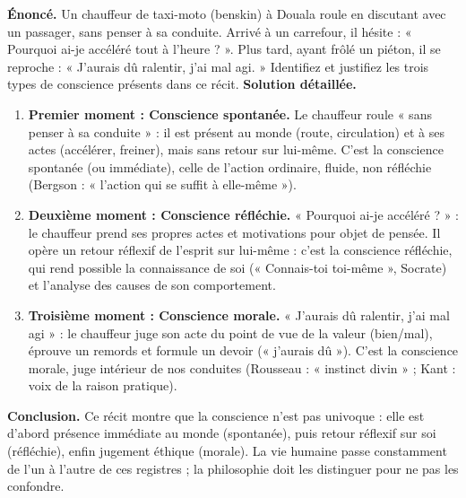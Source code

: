 \documentclass[11pt]{article}
\newcommand{\cle}[1]{{\popxbold\color{popdark}#1}}
\begin{document}
\begin{exoresolu}
\textbf{Énoncé.} Un chauffeur de taxi-moto (benskin) à Douala roule en discutant avec un passager, sans penser à sa conduite. Arrivé à un carrefour, il hésite : « Pourquoi ai-je accéléré tout à l'heure ? ». Plus tard, ayant frôlé un piéton, il se reproche : « J'aurais dû ralentir, j'ai mal agi. » Identifiez et justifiez les trois types de conscience présents dans ce récit.
\tcblower
\textbf{Solution détaillée.}
\begin{enumerate}
\item \textbf{Premier moment : Conscience spontanée.} Le chauffeur roule « sans penser à sa conduite » : il est présent au monde (route, circulation) et à ses actes (accélérer, freiner), mais sans retour sur lui-même. C'est la \cle{conscience spontanée} (ou immédiate), celle de l'action ordinaire, fluide, non réfléchie (Bergson : « l'action qui se suffit à elle-même »).
\item \textbf{Deuxième moment : Conscience réfléchie.} « Pourquoi ai-je accéléré ? » : le chauffeur prend ses propres actes et motivations pour objet de pensée. Il opère un \cle{retour réflexif} de l'esprit sur lui-même : c'est la \cle{conscience réfléchie}, qui rend possible la \cle{connaissance de soi} (« Connais-toi toi-même », Socrate) et l'analyse des causes de son comportement.
\item \textbf{Troisième moment : Conscience morale.} « J'aurais dû ralentir, j'ai mal agi » : le chauffeur juge son acte du point de vue de la valeur (bien/mal), éprouve un \cle{remords} et formule un \cle{devoir} (« j'aurais dû »). C'est la \cle{conscience morale}, juge intérieur de nos conduites (Rousseau : « instinct divin » ; Kant : voix de la raison pratique).
\end{enumerate}
\textbf{Conclusion.} Ce récit montre que la conscience n'est pas univoque : elle est d'abord présence immédiate au monde (spontanée), puis retour réflexif sur soi (réfléchie), enfin jugement éthique (morale). La vie humaine passe constamment de l'un à l'autre de ces registres ; la philosophie doit les distinguer pour ne pas les confondre.
\end{exoresolu}
\end{document}
